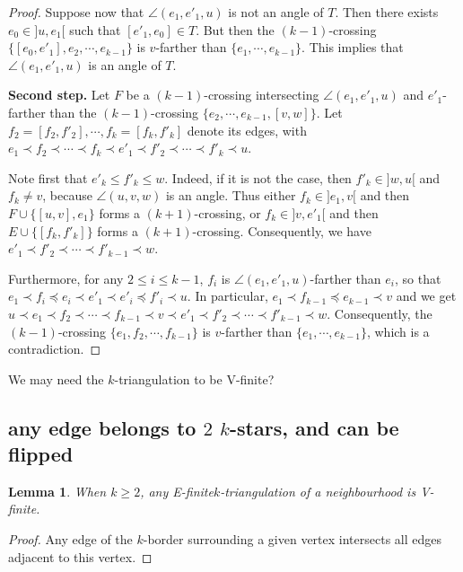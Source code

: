 \documentclass{amsart}
\newtheorem{lemma}[theorem]{Lemma}
\theoremstyle{remark}
\newcommand*{\nbd}[0]{neighbourhood\xspace}
\newcommand*{\ef}[0]{E-finite\xspace}
\newcommand*{\vf}[0]{V-finite\xspace}
\newcommand*{\ktg}[0]{$k$-triangulation\xspace}
\newcommand{\cl}{\prec}
\newcommand{\cle}{\preccurlyeq}
\begin{document}
\begin{proof}
Suppose now that $\angle(e_1, e'_1, u)$ is not an angle of $T$. 
Then there exists $e_0 \in ]u, e_1[$ such that $[e'_1, e_0] \in  T$. 
But then the $(k - 1)$-crossing $\{[e_0, e'_1], e_2, \cdots , e_{k-1}\}$ is $v$-farther than $\{e_1, \cdots , e_{k-1}\}$. 
This implies that $\angle(e_1, e'_1, u)$ is an angle of $T$.

{\bf Second step.}
Let $F$ be a $(k - 1)$-crossing intersecting $\angle(e_1, e'_1, u)$ and $e'_1$-farther than the $(k-1)$-crossing $\{e_2, \cdots , e_{k-1}, [v, w]\}$. 
Let $f_2 = [f_2, f'_2], \cdots , f_k = [f_k, f'_k]$ denote its edges, with $e_1 \cl f_2 \cl \cdots \cl f_k \cl e'_1 \cl f'_2 \cl \cdots \cl f'_k \cl u$.

Note first that $e'_k \leq f'_k \leq w$. 
Indeed, if it is not the case, then $f'_k \in ]w, u[$ and $f_k \neq v$, because $\angle(u, v, w)$ is an angle. 
Thus either $f_k \in ]e_1, v[$ and then $F \cup \{[u, v], e_1\}$ forms a $(k + 1)$-crossing, or $f_k \in ]v, e'_1[$ and then $E \cup \{[f_k, f'_k]\}$ forms a $(k + 1)$-crossing. 
Consequently, we have $e'_1 \cl f'_2 \cl \cdots \cl f'_{k-1} \cl w$.

Furthermore, for any $2 \leq i \leq k - 1$, $f_i$ is $\angle(e_1, e'_1, u)$-farther than $e_i$, so that $e_1 \cl f_i \cle e_i \cl e'_1 \cl e'_i \cle f'_i \cl u$. 
In particular, $e_1 \cl f_{k-1} \cle e_{k-1} \cl v$ and we get $u \cl e_1 \cl f_2 \cl \cdots \cl f_{k-1} \cl v \cl e'_1 \cl f'_2 \cl \cdots \cl f'_{k-1} \cl w$.
Consequently, the $(k - 1)$-crossing $\{e_1, f_2, \cdots , f_{k-1}\}$ is
$v$-farther than $\{e_1, \cdots , e_{k-1}\}$, which is a contradiction.











\end{proof}

We may need the \ktg to be \vf?

\subsection{any edge belongs to $2$ $k$-stars, and can be flipped}

\begin{lemma}
When $k\geq 2$, any \ef \ktg of a \nbd is \vf.
\end{lemma}
\begin{proof}
Any edge of the $k$-border surrounding a given vertex intersects all edges adjacent to this vertex.
\end{proof}
\end{document}
